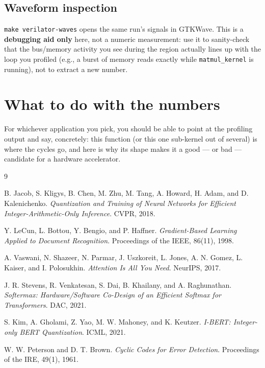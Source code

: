 \documentclass[11pt]{article}
\newcommand{\code}[1]{\texttt{#1}}
\begin{document}
\subsection{Waveform inspection}

\code{make verilator-waves} opens the same run's signals in GTKWave. This is
a \textbf{debugging aid only} here, not a numeric measurement: use it to
sanity-check that the bus/memory activity you see during the region actually
lines up with the loop you profiled (e.g., a burst of memory reads exactly
while \code{matmul\_kernel} is running), not to extract a new number.

\section*{What to do with the numbers}

For whichever application you pick, you should be able to point at the
profiling output and say, concretely: this function (or this one sub-kernel
out of several) is where the cycles go, and here is why its shape makes it a
good --- or bad --- candidate for a hardware accelerator.

\begin{thebibliography}{9}
\small

B. Jacob, S. Kligys, B. Chen, M. Zhu, M. Tang, A. Howard, H. Adam, and D.
Kalenichenko. \emph{Quantization and Training of Neural Networks for
Efficient Integer-Arithmetic-Only Inference}. CVPR, 2018.

Y. LeCun, L. Bottou, Y. Bengio, and P. Haffner. \emph{Gradient-Based Learning
Applied to Document Recognition}. Proceedings of the IEEE, 86(11), 1998.

A. Vaswani, N. Shazeer, N. Parmar, J. Uszkoreit, L. Jones, A. N. Gomez, L.
Kaiser, and I. Polosukhin. \emph{Attention Is All You Need}. NeurIPS, 2017.

J. R. Stevens, R. Venkatesan, S. Dai, B. Khailany, and A. Raghunathan.
\emph{Softermax: Hardware/Software Co-Design of an Efficient Softmax for
Transformers}. DAC, 2021.

S. Kim, A. Gholami, Z. Yao, M. W. Mahoney, and K. Keutzer. \emph{I-BERT:
Integer-only BERT Quantization}. ICML, 2021.

W. W. Peterson and D. T. Brown. \emph{Cyclic Codes for Error Detection}.
Proceedings of the IRE, 49(1), 1961.

\end{thebibliography}
\end{document}
